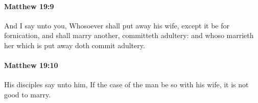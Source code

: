 		\paragraph{Matthew 19:9} %
			\label{MATTHEW-19-9}

			And I say unto you, Whosoever shall put away his wife, except it be for fornication, and shall marry another, committeth adultery: and whoso marrieth her which is put away doth commit adultery.

			\begin{framed}
			\scriptsize
				\begin{compactdesc}
					\item[SBLG] 
				\end{compactdesc}
			\end{framed}

		\paragraph{Matthew 19:10} %
			\label{MATTHEW-19-10}

			His disciples say unto him, If the case of the man be so with his wife, it is not good to marry.

